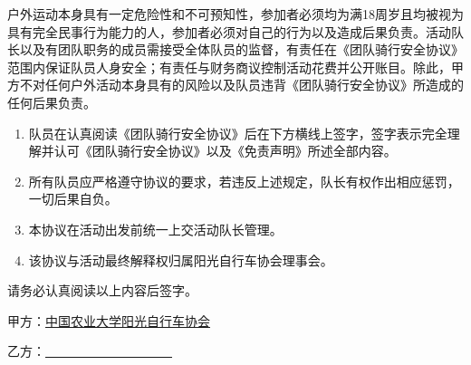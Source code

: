 \documentclass{ctexbook}
\begin{document}
户外运动本身具有一定危险性和不可预知性，参加者必须均为满18周岁且均被视为具有完全民事行为能力的人，参加者必须对自己的行为以及造成后果负责。活动队长以及有团队职务的成员需接受全体队员的监督，有责任在《团队骑行安全协议》范围内保证队员人身安全；有责任与财务商议控制活动花费并公开账目。除此，甲方不对任何户外活动本身具有的风险以及队员违背《团队骑行安全协议》所造成的任何后果负责。

\begin{enumerate}
    \item 队员在认真阅读《团队骑行安全协议》后在下方横线上签字，签字表示完全理解并认可《团队骑行安全协议》以及《免责声明》所述全部内容。
    \item 所有队员应严格遵守协议的要求，若违反上述规定，队长有权作出相应惩罚，一切后果自负。
    \item 本协议在活动出发前统一上交活动队长管理。
    \item 该协议与活动最终解释权归属阳光自行车协会理事会。
\end{enumerate}

\vspace{0.3cm}

请务必认真阅读以上内容后签字。

\vspace{0.3cm}

甲方：\underline{中国农业大学阳光自行车协会}

\vspace{0.3cm}

乙方：\underline{~~~~~~~~~~~~~~~~~~~~} 
\end{document}
